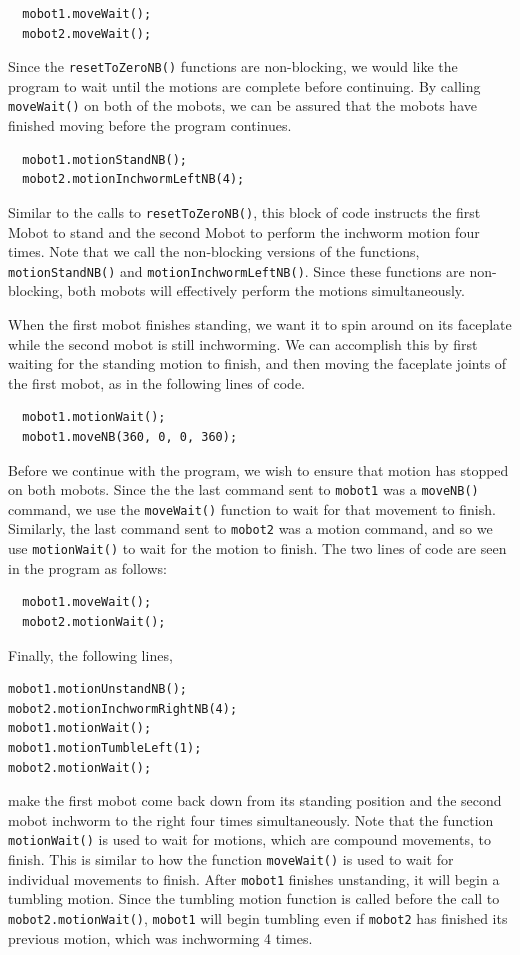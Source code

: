 \documentclass{article}
\begin{document}
\begin{verbatim}
  mobot1.moveWait();
  mobot2.moveWait();
\end{verbatim}
Since the \texttt{resetToZeroNB()} functions are non-blocking, we would like
the program to wait until the motions are complete before continuing. By
calling \texttt{moveWait()} on both of the mobots, we can be assured that
the mobots have finished moving before the program continues.

\begin{verbatim}
  mobot1.motionStandNB();
  mobot2.motionInchwormLeftNB(4);
\end{verbatim}
Similar to the calls to \texttt{resetToZeroNB()}, this block of code instructs 
the first Mobot to stand and the second Mobot to perform the inchworm motion four times.
Note that we call the non-blocking versions of the
functions, \texttt{motionStandNB()} and \texttt{motionInchwormLeftNB()}. Since these functions are
non-blocking, both mobots will effectively perform the motions simultaneously. 

When the first mobot finishes standing, we want it to spin around on its faceplate
while the second mobot is still inchworming. We can accomplish this by first
waiting for the standing motion to finish, and then moving the faceplate joints
of the first mobot, as in the following lines of code.
\begin{verbatim}
  mobot1.motionWait();
  mobot1.moveNB(360, 0, 0, 360);
\end{verbatim}

Before we continue with the program, we wish to ensure that motion has stopped on both
mobots. Since the the last command sent to \texttt{mobot1} was a \texttt{moveNB()}
command, we use the \texttt{moveWait()} function to wait for that movement to finish.
Similarly, the last command sent to \texttt{mobot2} was a motion command, and so we
use \texttt{motionWait()} to wait for the motion to finish. The two lines of code
are seen in the program as follows:
\begin{verbatim}
  mobot1.moveWait();
  mobot2.motionWait();
\end{verbatim}

Finally, the following lines,
\begin{verbatim}
mobot1.motionUnstandNB();
mobot2.motionInchwormRightNB(4);
mobot1.motionWait();
mobot1.motionTumbleLeft(1);
mobot2.motionWait();
\end{verbatim}
make the first mobot come back down from its standing position and the second mobot
inchworm to the right four times simultaneously. Note that the function 
\texttt{motionWait()} is used to wait for motions, which are compound
movements, to finish. This is similar to how
the function \texttt{moveWait()} is used to wait for individual movements
to finish. After \texttt{mobot1} finishes unstanding, it will begin 
a tumbling motion. Since the tumbling motion function is called before the call
to \texttt{mobot2.motionWait()}, \texttt{mobot1} will begin tumbling even if
\texttt{mobot2} has finished its previous motion, which was inchworming 4 times.
\end{document}
